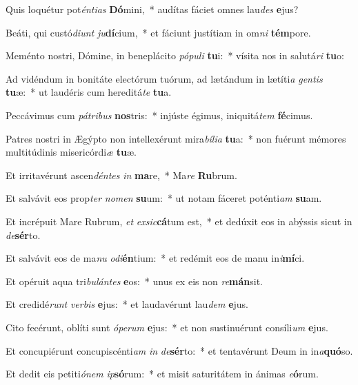 \item Quis loquétur pot\textit{én}\textit{ti}\textit{as} \textbf{Dó}mini,~* audítas fáciet omnes lau\textit{des} \textbf{e}jus?
\item Beáti, qui custó\textit{di}\textit{unt} \textit{ju}\textbf{dí}cium,~* et fáciunt justítiam in om\textit{ni} \textbf{tém}pore.
\item Meménto nostri, Dómine, in beneplácito \textit{pó}\textit{pu}\textit{li} \textbf{tu}i:~* vísita nos in salutá\textit{ri} \textbf{tu}o:
\item Ad vidéndum in bonitáte electórum tuórum, ad lætándum in lætíti\textit{a} \textit{gen}\textit{tis} \textbf{tu}æ:~* ut laudéris cum hereditá\textit{te} \textbf{tu}a.
\item Peccávimus cum \textit{pá}\textit{tri}\textit{bus} \textbf{nos}tris:~* injúste égimus, iniquitá\textit{tem} \textbf{fé}cimus.
\item Patres nostri in Ægýpto non intellexérunt mira\textit{bí}\textit{li}\textit{a} \textbf{tu}a:~* non fuérunt mémores multitúdinis misericórdi\textit{æ} \textbf{tu}æ.
\item Et irritavérunt ascen\textit{dén}\textit{tes} \textit{in} \textbf{ma}re,~* Ma\textit{re} \textbf{Ru}brum.
\item Et salvávit eos prop\textit{ter} \textit{no}\textit{men} \textbf{su}um:~* ut notam fáceret poténti\textit{am} \textbf{su}am.
\item Et incrépuit Mare Rubrum, \textit{et} \textit{ex}\textit{sic}\textbf{cá}tum est,~* et dedúxit eos in abýssis sicut in \textit{de}\textbf{sér}to.
\item Et salvávit eos de ma\textit{nu} \textit{o}\textit{di}\textbf{én}tium:~* et redémit eos de manu in\textit{i}\textbf{mí}ci.
\item Et opéruit aqua tri\textit{bu}\textit{lán}\textit{tes} \textbf{e}os:~* unus ex eis non \textit{re}\textbf{mán}sit.
\item Et credidé\textit{runt} \textit{ver}\textit{bis} \textbf{e}jus:~* et laudavérunt lau\textit{dem} \textbf{e}jus.
\item Cito fecérunt, oblíti sunt \textit{ó}\textit{pe}\textit{rum} \textbf{e}jus:~* et non sustinuérunt consíli\textit{um} \textbf{e}jus.
\item Et concupiérunt concupiscénti\textit{am} \textit{in} \textit{de}\textbf{sér}to:~* et tentavérunt Deum in in\textit{a}\textbf{quó}so.
\item Et dedit eis petiti\textit{ó}\textit{nem} \textit{ip}\textbf{só}rum:~* et misit saturitátem in ánimas \textit{e}\textbf{ó}rum.
